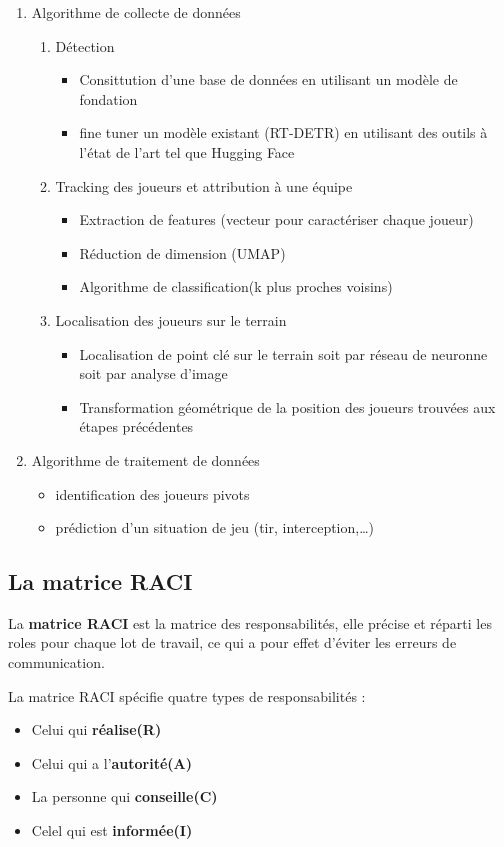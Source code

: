 \begin{enumerate}
    \item Algorithme de collecte de données
\begin{enumerate}
    \item Détection 
    \begin{itemize}
    \item Consittution d'une base de données en utilisant un modèle de fondation 
    \item fine tuner un modèle existant (RT-DETR) en utilisant des outils à l'état de l'art tel que Hugging Face 
    \end{itemize}
    \item Tracking des joueurs et attribution à une équipe 
    \begin{itemize}
        \item Extraction de features (vecteur pour caractériser chaque joueur)
        \item Réduction de dimension (UMAP) 
        \item Algorithme de classification(k plus proches voisins)
    \end{itemize}
    \item Localisation des joueurs sur le terrain 
    \begin{itemize}
        \item Localisation de point clé sur le terrain soit par réseau de neuronne soit par analyse d'image 
        \item Transformation géométrique de la position des joueurs trouvées aux étapes précédentes
    \end{itemize}
\end{enumerate}
\item Algorithme de traitement de données
\begin{itemize}
    \item identification des joueurs pivots 
    \item prédiction d'un situation de jeu (tir, interception,\dots)
\end{itemize}
\end{enumerate}
\subsection{La matrice RACI}
La \textbf{matrice RACI} est la matrice des responsabilités, elle précise et réparti les roles pour chaque lot de travail, ce qui a pour effet d'éviter les erreurs de communication.

La matrice RACI spécifie quatre types de responsabilités : 
\begin{itemize}
	\item Celui qui \textbf{réalise(R)}
	\item Celui qui a l'\textbf{autorité(A)}
	\item La personne qui \textbf{conseille(C)}
	\item Celel qui est \textbf{informée(I)}
\end{itemize}
